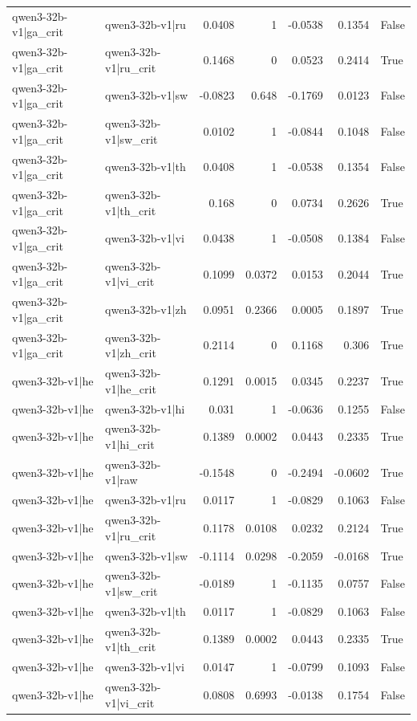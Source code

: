 \begin{table}
\begin{tabular}{l l r r r r l}
qwen3-32b-v1|ga_crit & qwen3-32b-v1|ru & 0.0408 & 1 & -0.0538 & 0.1354 & False \\
qwen3-32b-v1|ga_crit & qwen3-32b-v1|ru_crit & 0.1468 & 0 & 0.0523 & 0.2414 & True \\
qwen3-32b-v1|ga_crit & qwen3-32b-v1|sw & -0.0823 & 0.648 & -0.1769 & 0.0123 & False \\
qwen3-32b-v1|ga_crit & qwen3-32b-v1|sw_crit & 0.0102 & 1 & -0.0844 & 0.1048 & False \\
qwen3-32b-v1|ga_crit & qwen3-32b-v1|th & 0.0408 & 1 & -0.0538 & 0.1354 & False \\
qwen3-32b-v1|ga_crit & qwen3-32b-v1|th_crit & 0.168 & 0 & 0.0734 & 0.2626 & True \\
qwen3-32b-v1|ga_crit & qwen3-32b-v1|vi & 0.0438 & 1 & -0.0508 & 0.1384 & False \\
qwen3-32b-v1|ga_crit & qwen3-32b-v1|vi_crit & 0.1099 & 0.0372 & 0.0153 & 0.2044 & True \\
qwen3-32b-v1|ga_crit & qwen3-32b-v1|zh & 0.0951 & 0.2366 & 0.0005 & 0.1897 & True \\
qwen3-32b-v1|ga_crit & qwen3-32b-v1|zh_crit & 0.2114 & 0 & 0.1168 & 0.306 & True \\
qwen3-32b-v1|he & qwen3-32b-v1|he_crit & 0.1291 & 0.0015 & 0.0345 & 0.2237 & True \\
qwen3-32b-v1|he & qwen3-32b-v1|hi & 0.031 & 1 & -0.0636 & 0.1255 & False \\
qwen3-32b-v1|he & qwen3-32b-v1|hi_crit & 0.1389 & 0.0002 & 0.0443 & 0.2335 & True \\
qwen3-32b-v1|he & qwen3-32b-v1|raw & -0.1548 & 0 & -0.2494 & -0.0602 & True \\
qwen3-32b-v1|he & qwen3-32b-v1|ru & 0.0117 & 1 & -0.0829 & 0.1063 & False \\
qwen3-32b-v1|he & qwen3-32b-v1|ru_crit & 0.1178 & 0.0108 & 0.0232 & 0.2124 & True \\
qwen3-32b-v1|he & qwen3-32b-v1|sw & -0.1114 & 0.0298 & -0.2059 & -0.0168 & True \\
qwen3-32b-v1|he & qwen3-32b-v1|sw_crit & -0.0189 & 1 & -0.1135 & 0.0757 & False \\
qwen3-32b-v1|he & qwen3-32b-v1|th & 0.0117 & 1 & -0.0829 & 0.1063 & False \\
qwen3-32b-v1|he & qwen3-32b-v1|th_crit & 0.1389 & 0.0002 & 0.0443 & 0.2335 & True \\
qwen3-32b-v1|he & qwen3-32b-v1|vi & 0.0147 & 1 & -0.0799 & 0.1093 & False \\
qwen3-32b-v1|he & qwen3-32b-v1|vi_crit & 0.0808 & 0.6993 & -0.0138 & 0.1754 & False \\

\end{tabular}
\end{table}
